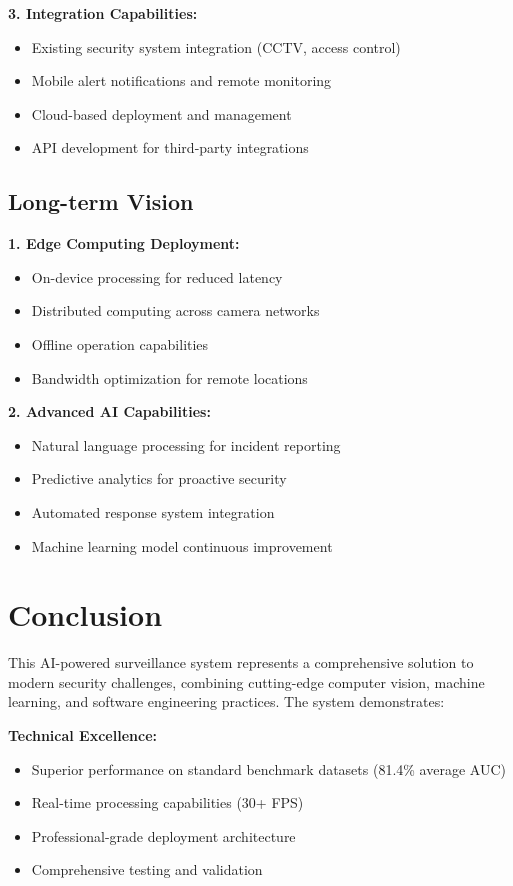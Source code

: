 \documentclass[12pt,a4paper]{article}
\begin{document}
\textbf{3. Integration Capabilities:}
\begin{itemize}
    \item Existing security system integration (CCTV, access control)
    \item Mobile alert notifications and remote monitoring
    \item Cloud-based deployment and management
    \item API development for third-party integrations
\end{itemize}

\subsection{Long-term Vision}

\textbf{1. Edge Computing Deployment:}
\begin{itemize}
    \item On-device processing for reduced latency
    \item Distributed computing across camera networks
    \item Offline operation capabilities
    \item Bandwidth optimization for remote locations
\end{itemize}

\textbf{2. Advanced AI Capabilities:}
\begin{itemize}
    \item Natural language processing for incident reporting
    \item Predictive analytics for proactive security
    \item Automated response system integration
    \item Machine learning model continuous improvement
\end{itemize}

\section{Conclusion}

This AI-powered surveillance system represents a comprehensive solution to modern security challenges, combining cutting-edge computer vision, machine learning, and software engineering practices. The system demonstrates:

\textbf{Technical Excellence:}
\begin{itemize}
    \item Superior performance on standard benchmark datasets (81.4\% average AUC)
    \item Real-time processing capabilities (30+ FPS)
    \item Professional-grade deployment architecture
    \item Comprehensive testing and validation
\end{itemize}
\end{document}
